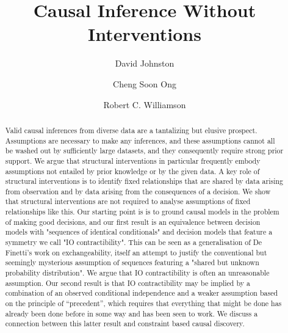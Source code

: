\documentclass[USenglish,onecolumn]{article}
\begin{document}
 


  \author*[1]{David Johnston}

  \author[2]{Cheng Soon Ong}

  \author[3]{Robert C. Williamson}




  \title{\huge Causal Inference Without Interventions}



  \begin{abstract}
{Valid causal inferences from diverse data are a tantalizing but elusive prospect. Assumptions are necessary to make any inferences, and these assumptions cannot all be washed out by sufficiently large datasets, and they consequently require strong prior support. We argue that structural interventions in particular frequently embody assumptions not entailed by prior knowledge or by the given data. A key role of structural interventions is to identify fixed relationships that are shared by data arising from observation and by data arising from the consequences of a decision. We show that structural interventions are not required to analyse assumptions of fixed relationships like this. Our starting point is is to ground causal models in the problem of making good decisions, and our first result is an equivalence between decision models with "sequences of identical conditionals" and decision models that feature a symmetry we call "IO contractibility". This can be seen as a generalisation of De Finetti's work on exchangeability, itself an attempt to justify the conventional but seemingly mysterious assumption of sequences featuring a "shared but unknown probability distribution". We argue that IO contractibility is often an unreasonable assumption. Our second result is that IO contractibility may be implied by a combination of an observed conditional independence and a weaker assumption based on the principle of ``precedent'', which requires that everything that might be done has already been done before in some way and has been seen to work. We discuss a connection between this latter result and constraint based causal discovery.}
\end{abstract}
\end{document}
